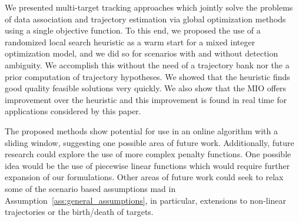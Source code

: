 We presented multi-target tracking approaches which jointly solve the problems of data association and trajectory estimation via global optimization methods using a single objective function. To this end, we proposed the use of a randomized local search heuristic as a warm start for a mixed integer optimization model, and we did so for scenarios with and without detection ambiguity. We accomplish this without the need of a trajectory bank nor the a prior computation of trajectory hypotheses. We showed that the heuristic finds good quality feasible solutions very quickly. We also show that the MIO offers improvement over the heuristic and this improvement is found in real time for applications considered by this paper.  

The proposed methods show potential for use in an online algorithm with a sliding window, suggesting one possible area of future work. Additionally, future research could explore the use of more complex penalty functions. One possible idea would be the use of piecewise linear functions which would require further expansion of our formulations. Other areas of future work could seek to relax some of the scenario based assumptions mad in Assumption~\ref{ass:general_assumptions}, in particular, extensions to non-linear trajectories or the birth/death of targets. 